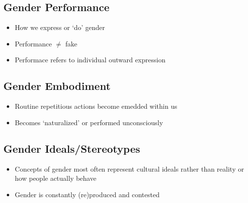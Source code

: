 \documentclass{article}
\begin{document}
\subsection{Gender Performance}
\begin{itemize}
  \item How we express or `do' gender
  \item Performance \( \neq \) fake
  \item Performace refers to individual outward expression
\end{itemize}

\subsection{Gender Embodiment}
\begin{itemize}
  \item Routine repetitious actions become emedded within us
  \item Becomes `naturalized' or performed unconsciously
\end{itemize}

\subsection{Gender Ideals/Stereotypes}
\begin{itemize}
  \item Concepts of gender most often represent cultural ideals rather than reality or how people actually behave
  \item Gender is constantly (re)produced and contested
\end{itemize}
\end{document}
